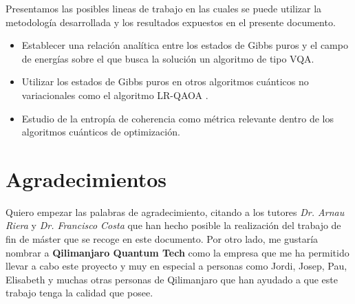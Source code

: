 Presentamos las posibles lineas de trabajo en las cuales se puede utilizar la metodología desarrollada y los resultados expuestos en el presente documento.

\begin{itemize}
    
\item Establecer una relación analítica entre los estados de Gibbs puros y el campo de energías sobre el que busca la solución un algoritmo de tipo VQA.

\item Utilizar los estados de Gibbs puros en otros algoritmos cuánticos no variacionales como el algoritmo LR-QAOA \citep{montañez}.

\item Estudio de la entropía de coherencia como métrica relevante dentro de los algoritmos cuánticos de optimización.
    
\end{itemize}


\section{Agradecimientos}

Quiero empezar las palabras de agradecimiento, citando a los tutores \textit{Dr. Arnau Riera} y \textit{Dr. Francisco Costa} que han hecho posible la realización del trabajo de fin de máster que se recoge en este documento. Por otro lado, me gustaría nombrar a  \textbf{Qilimanjaro Quantum Tech} como la empresa que me ha permitido llevar a cabo este proyecto y muy en especial a personas como Jordi, Josep, Pau, Elisabeth y muchas otras personas de Qilimanjaro que han ayudado a que este trabajo tenga la calidad que posee.